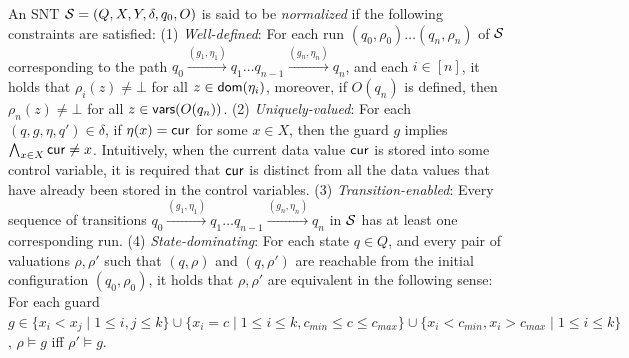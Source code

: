 
An SNT ${\mathcal{S} }=(Q,X,Y,\delta,q_0,O)$ is said to be \emph{normalized} if the following constraints are satisfied:
(1) \emph{Well-defined}: For each run $(q_0,\rho_0) \dots (q_n,\rho_n)$ of ${\mathcal{S} }$ corresponding to the path $q_0 \xrightarrow{(g_1,\eta_1)} q_1 \dots q_{n-1} \xrightarrow{(g_n,\eta_n)} q_n$, and each $i \in [n]$, it holds that $\rho_{i}(z) \neq \bot$ for all $z \in \mathsf{dom}(\eta_i)$, 
%
moreover, if $O(q_n)$ is defined, then $\rho_n(z)\neq\bot$ for all  $z\in \mathsf{vars}(O(q_n))$. (2) \emph{Uniquely-valued}: For each $(q,g,\eta,q') \in \delta$, if $\eta(x)=\mathsf{cur}$ for some $x \in X$, then the guard $g$ implies $\bigwedge_{x \in X} \mathsf{cur} \neq x$.  Intuitively, when the current data value $\mathsf{cur}$ is stored into some control variable, it is required that $\mathsf{cur}$ is distinct from all the data values that have already been stored in the control variables. (3) \emph{Transition-enabled}: Every sequence of transitions $q_0 \xrightarrow{(g_1,\eta_1)} q_1 \dots q_{n-1} \xrightarrow{(g_n,\eta_n)} q_n$ in ${\mathcal{S} }$ has at least one corresponding run. (4) \emph{State-dominating}: For each state $q \in Q$, and every pair of valuations $\rho,\rho'$ such that $(q,\rho)$ and $(q,\rho')$ are reachable from the initial configuration $(q_0,\rho_0)$, it holds that $\rho,\rho'$ are equivalent in the following sense: For each guard $g \in \{x_i < x_j \mid 1 \le i, j \le k\} \cup \{x_i = c \mid 1 \le i \le k, c_{min} \le c \le c_{max} \} \cup \{x_i < c_{min},x_i > c_{max}  \mid 1 \le i \le k\}$, $\rho \models g$ iff $\rho' \models g$.

